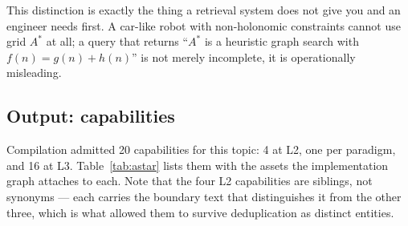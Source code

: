 \documentclass[10pt,a4paper]{article}
\begin{document}
\noindent This distinction is exactly the thing a retrieval system does not give
you and an engineer needs first. A car-like robot with non-holonomic constraints
cannot use grid $A^\ast$ at all; a query that returns ``$A^\ast$ is a heuristic
graph search with $f(n)=g(n)+h(n)$'' is not merely incomplete, it is
operationally misleading.

\subsection{Output: capabilities}

Compilation admitted 20 capabilities for this topic: 4 at L2, one per paradigm,
and 16 at L3. Table~\ref{tab:astar} lists them with the assets the implementation
graph attaches to each. Note that the four L2 capabilities are siblings, not
synonyms --- each carries the boundary text that distinguishes it from the other
three, which is what allowed them to survive deduplication as distinct entities.
\end{document}
